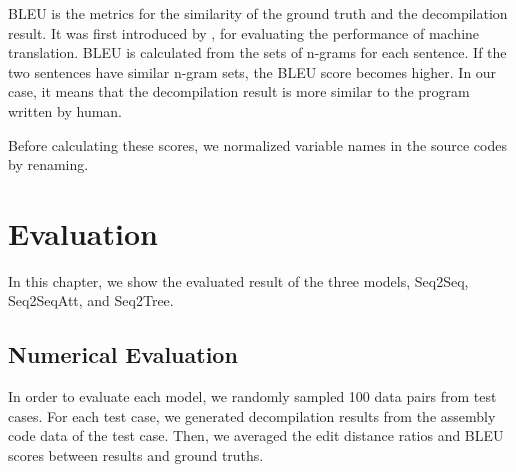 \documentclass[senior,final,11pt]{iscs-thesis}
\begin{document}
BLEU is the metrics for the similarity of the ground truth and the decompilation result. 
It was first introduced by \citet{BLEU}, for evaluating the performance of machine translation.
BLEU is calculated from the sets of n-grams for each sentence. 
If the two sentences have similar n-gram sets, the BLEU score becomes higher.
In our case, it means that the decompilation result is more similar to the program written by human. %


Before calculating these scores, we normalized variable names in the source codes by renaming.

\chapter{Evaluation}
In this chapter, we show the evaluated result of the three models, Seq2Seq, Seq2SeqAtt, and Seq2Tree.








\section{Numerical Evaluation}
In order to evaluate each model, we randomly sampled 100 data pairs from test cases.
For each test case, we generated decompilation results from the assembly code data of the test case.
Then, we averaged the edit distance ratios and BLEU scores between results and ground truths.
\end{document}
